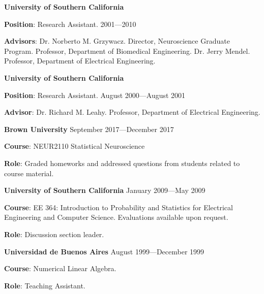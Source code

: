\documentclass{article}
\begin{document}
\par
\vspace{.1in}
{\bf University of Southern California}
\par
{\bf Position}: Research Assistant. \hspace*{\fill} 2001---2010
\par
{\bf Advisors}: Dr. Norberto M. Grzywacz. Director, Neuroscience Graduate
Program. Professor, Department of Biomedical Engineering. Dr. Jerry Mendel.
Professor, Department of Electrical Engineering.

\par
\vspace{.1in}
{\bf University of Southern California}
\par
{\bf Position}: Research Assistant. \hspace*{\fill} August 2000---August 2001
\par
{\bf Advisor}: Dr. Richard M. Leahy. Professor, Department of Electrical
Engineering.

\par
\vspace{2\baselineskip}
{\bf Brown University} \hspace*{\fill} September 2017---December 2017

\par
{\bf Course}: NEUR2110 Statistical Neuroscience

\par
{\bf Role}: Graded homeworks and addressed questions from students related to course material.

\par
\vspace{.1in}
{\bf University of Southern California} \hspace*{\fill} January 2009---May 2009
\par
{\bf Course}: EE 364: Introduction to Probability and Statistics for Electrical Engineering and Computer Science. Evaluations available upon request.
\par
{\bf Role}: Discussion section leader.

\par
\vspace{.1in}
{\bf Universidad de Buenos Aires} \hspace*{\fill} August 1999---December 1999
\par
{\bf Course}: Numerical Linear Algebra.
\par
{\bf Role}: Teaching Assistant.
\end{document}
